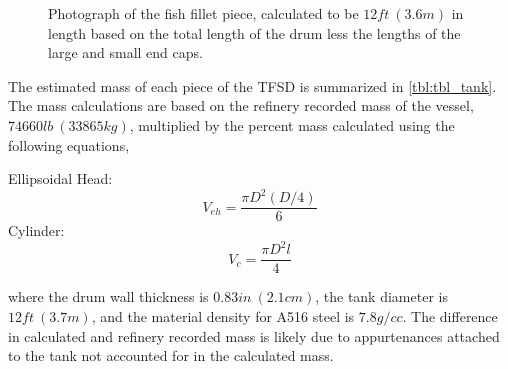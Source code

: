 \documentclass[10pt,parskip=half,
toc=sectionentrywithdots,
bibliography=totocnumbered,
captions=tableheading,numbers=noendperiod]{scrartcl}
\begin{document}
\begin{figure}[H]
\hypertarget{fig:fillet}{%
\begin{center}
\end{center}
\caption{Photograph of the fish fillet piece, calculated to be \(12ft\:(3.6m)\)
in length based on the total length of the drum less the lengths of the
large and small end caps.\cite{Malone2019a}}\label{fig:fillet}
}
\end{figure}

The estimated mass of each piece of the TFSD is summarized in
\cref{tbl:tbl_tank}. The mass calculations are based on the refinery
recorded mass of the vessel, \(74660lb\:(33865kg)\), multiplied by the
percent mass calculated using the following equations,

Ellipsoidal Head:
\begin{equation}V_{eh}=\frac{\pi D^2 (D/4)}{6}\end{equation} Cylinder:
\begin{equation}V_c = \frac{\pi D^2 l}{4}\end{equation}

where the drum wall thickness is \(0.83in\:(2.1cm)\), the tank diameter
is \(12ft\:(3.7m)\), and the material density for A516 steel is
\(7.8g/cc\)\cite{Malone2019}. The difference in calculated and refinery
recorded mass is likely due to appurtenances attached to the tank not
accounted for in the calculated mass.
\end{document}
